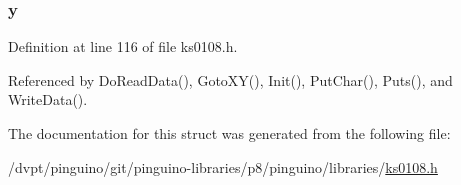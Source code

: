 \hypertarget{structlcd_coord_ad87f9078b74ef74a58041131d06283c2}{
\subsubsection[{y}]{ y}}\label{structlcd_coord_ad87f9078b74ef74a58041131d06283c2}


Definition at line 116 of file ks0108.\-h.



Referenced by Do\-Read\-Data(), Goto\-X\-Y(), Init(), Put\-Char(), Puts(), and Write\-Data().



The documentation for this struct was generated from the following file\-:\begin{DoxyCompactItemize}
\item 
/dvpt/pinguino/git/pinguino-\/libraries/p8/pinguino/libraries/\hyperlink{p8_2pinguino_2libraries_2ks0108_8h}{ks0108.\-h}\end{DoxyCompactItemize}
